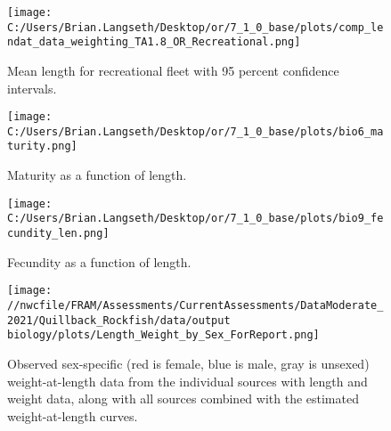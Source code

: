 \documentclass[11pt,
  english,
  a4paper,
]{article}
\begin{document}
\begin{figure}
\centering
\texttt{[image: C:/Users/Brian.Langseth/Desktop/or/7\_1\_0\_base/plots/comp\_lendat\_data\_weighting\_TA1.8\_OR\_Recreational.png]}
\caption{Mean length for recreational fleet with 95 percent confidence intervals.\label{fig:mean-rec-len-data}}
\end{figure}

\tagmcend\tagstructend


\begin{figure}
\centering
\texttt{[image: C:/Users/Brian.Langseth/Desktop/or/7\_1\_0\_base/plots/bio6\_maturity.png]}
\caption{Maturity as a function of length.\label{fig:maturity}}
\end{figure}

\tagmcend\tagstructend


\begin{figure}
\centering
\texttt{[image: C:/Users/Brian.Langseth/Desktop/or/7\_1\_0\_base/plots/bio9\_fecundity\_len.png]}
\caption{Fecundity as a function of length.\label{fig:fecundity}}
\end{figure}

\tagmcend\tagstructend


\begin{figure}
\centering
\texttt{[image: //nwcfile/FRAM/Assessments/CurrentAssessments/DataModerate\_2021/Quillback\_Rockfish/data/output biology/plots/Length\_Weight\_by\_Sex\_ForReport.png]}
\caption{Observed sex-specific (red is female, blue is male, gray is unsexed) weight-at-length data from the individual sources with length and weight data, along with all sources combined with the estimated weight-at-length curves.\label{fig:len-weight-survey}}
\end{figure}

\tagmcend\tagstructend
\end{document}
